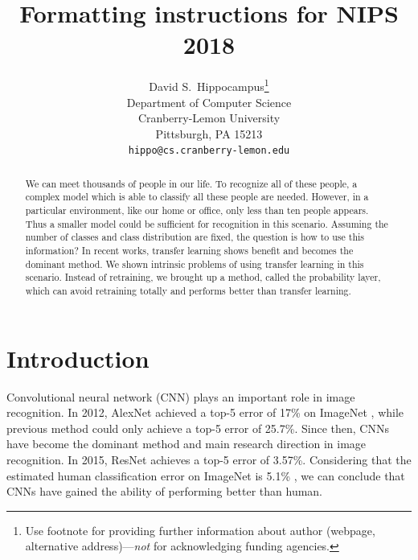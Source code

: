 \documentclass{article}
\title{Formatting instructions for NIPS 2018}
\author{
  David S.~Hippocampus\thanks{Use footnote for providing further
    information about author (webpage, alternative
    address)---\emph{not} for acknowledging funding agencies.} \\
  Department of Computer Science\\
  Cranberry-Lemon University\\
  Pittsburgh, PA 15213 \\
  \texttt{hippo@cs.cranberry-lemon.edu} \\
}
\begin{document}

\maketitle


\begin{abstract}
  We can meet thousands of people in our life. To recognize all of these people, a complex model which is able to classify all these people are needed. However, in a particular environment, like our home or office, only less than ten people appears. Thus a smaller model could be sufficient for recognition in this scenario. Assuming the number of classes and class distribution are fixed, the question is how to use this information? In recent works, transfer learning shows benefit and becomes the dominant method. We shown intrinsic problems of using transfer learning in this scenario. Instead of retraining, we brought up a method, called the probability layer, which can avoid retraining totally and performs better than transfer learning.
\end{abstract}


\section{Introduction}
Convolutional neural network (CNN) plays an important role in image recognition. In 2012, AlexNet \cite{krizhevsky2012imagenet} achieved a top-5 error of 17\% on ImageNet \cite{deng2009imagenet}, while previous method could only achieve a top-5 error of 25.7\%. Since then, CNNs have become the dominant method and main research direction in image recognition. In 2015, ResNet \cite{he2016deep} achieves a top-5 error of 3.57\%. Considering that the estimated human classification error on ImageNet is 5.1\% \cite{russakovsky2015imagenet}, we can conclude that CNNs have gained the ability of performing better than human.
\end{document}
